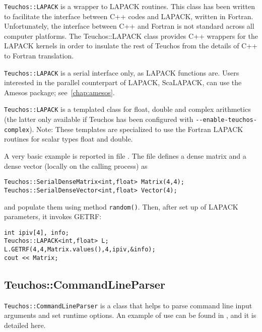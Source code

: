 \verb!Teuchos::LAPACK! is a wrapper to LAPACK routines. This class has
been written to facilitate the interface between C++ codes and LAPACK,
written in Fortran. Unfortunately, the interface between C++ and Fortran
is not standard across all computer platforms. The Teuchos::LAPACK class
provides C++ wrappers for the LAPACK kernels in order to insulate the
rest of Teuchos from the details of C++ to Fortran translation.

\verb!Teuchos::LAPACK! is a serial interface only, as LAPACK functions
are. Users interested in the parallel counterpart of LAPACK, ScaLAPACK,
can use the Amesos package; see~\ref{chap:amesos}.

\verb!Teuchos::LAPACK! is a templated class for float, double and
complex arithmetics (the latter only available if Teuchos has been
configured with \verb!--enable-teuchos-complex!).  Note: These templates
are specialized to use the Fortran LAPACK routines for scalar types
float and double.

A very basic example is reported in file . The
file defines a dense matrix and a dense vector (locally on the calling
process)  as
\begin{verbatim}
Teuchos::SerialDenseMatrix<int,float> Matrix(4,4);
Teuchos::SerialDenseVector<int,float> Vector(4);
\end{verbatim}
and populate them using method \verb!random()!. Then, after set up of
LAPACK parameters, it invokes GETRF:
\begin{verbatim}
int ipiv[4], info;
Teuchos::LAPACK<int,float> L;
L.GETRF(4,4,Matrix.values(),4,ipiv,&info); 
cout << Matrix;
\end{verbatim}


\subsection{Teuchos::CommandLineParser}
\label{sec:teuchos:CLP}

\verb!Teuchos::CommandLineParser! is a class that helps to parse command
line input arguments and set runtime options. An example of use can be
found in , and it is detailed here.

